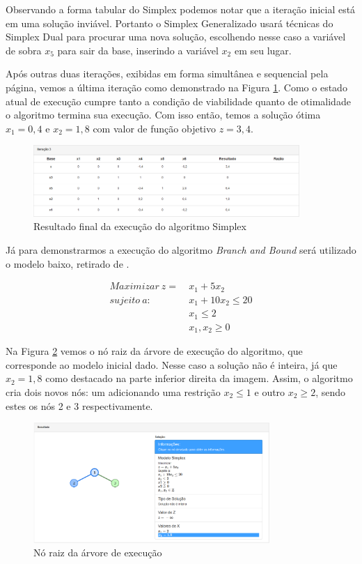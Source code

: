 \documentclass [11pt]{articleSBPO}
\begin{document}
Observando a forma tabular do Simplex podemos notar que a iteração inicial está em uma solução inviável. Portanto o Simplex Generalizado usará técnicas do Simplex Dual para procurar uma nova solução, escolhendo nesse caso a variável de sobra $x_{5}$ para sair da base, inserindo a variável $x_{2}$ em seu lugar.

Após outras duas iterações, exibidas em forma simultânea e sequencial pela página, vemos a última iteração como demonstrado na Figura \ref{fig:simplexit3}. Como o estado atual de execução cumpre tanto a condição de viabilidade quanto de otimalidade o algoritmo termina sua execução. Com isso então, temos a solução ótima $x_{1}=0,4$ e $x_{2}=1,8$ com valor de função objetivo $z = 3,4$.

\begin{figure}[!h]
	\centering
	\includegraphics[width=0.9\textwidth]{img/simplexit3.png}
	\caption[]{Resultado final da execução do algoritmo Simplex}
	\label{fig:simplexit3}
\end{figure}

Já para demonstrarmos a execução do algoritmo \textit{Branch and Bound} será utilizado o modelo baixo, retirado de \cite{hillier}.

\begin{equation*}
\begin{split}
Maximizar\ z =\ & x_{1} + 5x_{2} \\
sujeito\ a:\ \ \ \ &  x_{1} + 10x_{2} \leq 20 \\
& x_{1} \leq 2 \\
& x_{1}, x_{2} \geq 0
\end{split}
\end{equation*}

Na Figura \ref{fig:bbno1} vemos o nó raiz da árvore de execução do algoritmo, que corresponde ao modelo inicial dado. Nesse caso a solução não é inteira, já que $x_{2}=1,8$ como destacado na parte inferior direita da imagem. Assim, o algoritmo cria dois novos nós: um adicionando uma restrição $x_{2} \leq 1$ e outro $x_{2} \geq 2$, sendo estes os nós 2 e 3 respectivamente.

\begin{figure}[!h]
	\centering
	\includegraphics[width=0.8\textwidth]{img/bbno1.png}
	\caption[]{Nó raiz da árvore de execução}
	\label{fig:bbno1}
\end{figure}
\end{document}
